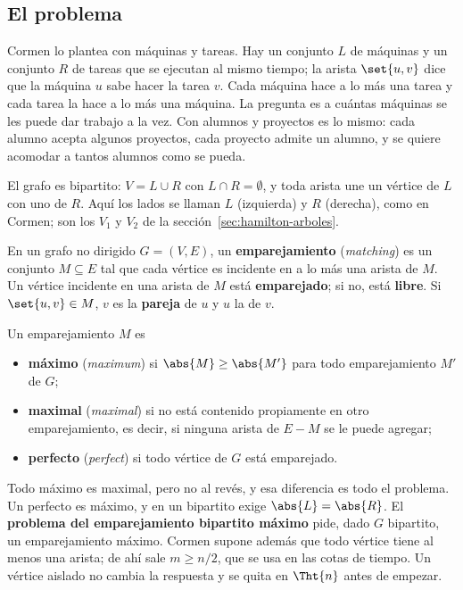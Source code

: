 \documentclass[11pt,letterpaper]{article}
\begin{document}
\subsection*{El problema}

Cormen lo plantea con máquinas y tareas. Hay un conjunto $L$ de
máquinas y un conjunto $R$ de tareas que se ejecutan al mismo
tiempo; la arista $\set{u, v}$ dice que la máquina $u$ sabe hacer la
tarea $v$. Cada máquina hace a lo más una tarea y cada tarea la hace
a lo más una máquina. La pregunta es a cuántas máquinas se les puede
dar trabajo a la vez. Con alumnos y proyectos es lo mismo: cada
alumno acepta algunos proyectos, cada proyecto admite un alumno, y se
quiere acomodar a tantos alumnos como se pueda.

El grafo es bipartito: $V = L \cup R$ con $L \cap R = \emptyset$, y
toda arista une un vértice de $L$ con uno de $R$. Aquí los lados se
llaman $L$ (izquierda) y $R$ (derecha), como en Cormen; son los $V_1$
y $V_2$ de la sección~\ref{sec:hamilton-arboles}.

\begin{definicion}[Emparejamiento]
  \label{def:emparejamiento}
  En un grafo no dirigido $G = (V, E)$, un \textbf{emparejamiento}
  (\textit{matching}) es un conjunto $M \subseteq E$ tal que cada
  vértice es incidente en a lo más una arista de $M$. Un vértice
  incidente en una arista de $M$ está \textbf{emparejado}; si no,
  está \textbf{libre}. Si $\set{u, v} \in M$, $v$ es la
  \textbf{pareja} de $u$ y $u$ la de $v$.
\end{definicion}

\begin{definicion}
  \label{def:emparejamiento-maximo}
  Un emparejamiento $M$ es
  \begin{itemize}
    \item \textbf{máximo} (\textit{maximum}) si
      $\abs{M} \ge \abs{M'}$ para todo emparejamiento $M'$ de $G$;
    \item \textbf{maximal} (\textit{maximal}) si no está contenido
      propiamente en otro emparejamiento, es decir, si ninguna arista
      de $E - M$ se le puede agregar;
    \item \textbf{perfecto} (\textit{perfect}) si todo vértice de $G$
      está emparejado.
  \end{itemize}
\end{definicion}

Todo máximo es maximal, pero no al revés, y esa diferencia es todo
el problema. Un perfecto es máximo, y en un bipartito exige
$\abs{L} = \abs{R}$. El \textbf{problema del emparejamiento
bipartito máximo} pide, dado $G$ bipartito, un emparejamiento máximo.
Cormen supone además que todo vértice tiene al menos una arista; de
ahí sale $m \ge n/2$, que se usa en las cotas de tiempo. Un vértice
aislado no cambia la respuesta y se quita en $\Tht{n}$ antes de
empezar.
\end{document}
